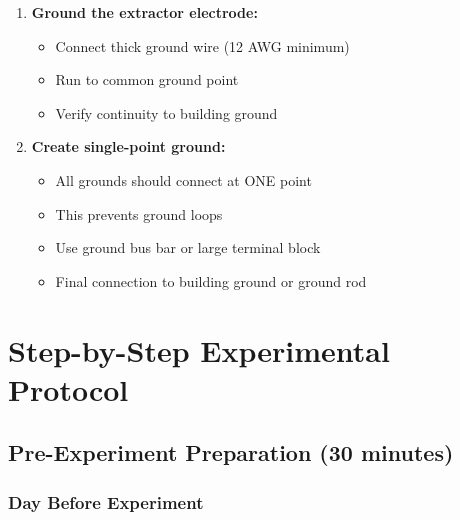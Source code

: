 \documentclass[11pt]{article}
\begin{document}
\begin{enumerate}
\item \textbf{Ground the extractor electrode:}
  \begin{itemize}
  \item Connect thick ground wire (12 AWG minimum)
  \item Run to common ground point
  \item Verify continuity to building ground
  \end{itemize}

\item \textbf{Create single-point ground:}
  \begin{itemize}
  \item All grounds should connect at ONE point
  \item This prevents ground loops
  \item Use ground bus bar or large terminal block
  \item Final connection to building ground or ground rod
  \end{itemize}
\end{enumerate}

\section{Step-by-Step Experimental Protocol}

\subsection{Pre-Experiment Preparation (30 minutes)}

\subsubsection{Day Before Experiment}
\end{document}
